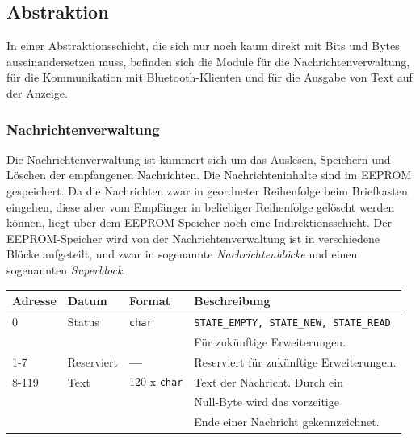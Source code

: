 \documentclass[ngerman]{article}
\begin{document}
\subsection{Abstraktion}

In einer Abstraktionsschicht, die sich nur noch kaum direkt mit Bits und Bytes
auseinandersetzen muss, befinden sich die Module für die
Nachrichtenverwaltung, für die Kommunikation mit Bluetooth-Klienten
und für die Ausgabe von Text auf der Anzeige.


\subsubsection{Nachrichtenverwaltung}

Die Nachrichtenverwaltung ist kümmert sich um das Auslesen, Speichern und Löschen
der empfangenen Nachrichten. Die Nachrichteninhalte sind im EEPROM gespeichert.
Da die Nachrichten zwar in geordneter Reihenfolge beim Briefkasten eingehen, diese aber
vom Empfänger in beliebiger Reihenfolge gelöscht werden können, liegt über dem
EEPROM-Speicher noch eine In\-di\-rek\-tions\-schicht. Der EEPROM-Speicher wird von der
Nachrichtenverwaltung ist in verschiedene Blöcke aufgeteilt, und zwar in
sogenannte \textit{Nachrichtenblöcke} und einen sogenannten
\textit{Superblock}.


\begin{tabular}{|l|l|l|l|}
    \hline
    {\bf Adresse} & {\bf Datum} & {\bf Format} & {\bf Beschreibung} \\
    \hline
    \hline
    0 & Status & {\tt char} & {\tt STATE\_EMPTY, STATE\_NEW,  STATE\_READ} \\
                          &&& Für zukünftige Erweiterungen. \\
    \hline
    1-7 & Reserviert & {\bf --- }  & Reserviert für zukünftige Erweiterungen. \\
    \hline
    8-119 & Text & 120 x {\tt char} & Text der Nachricht. Durch ein \\
                                  &&& Null-Byte wird das vorzeitige \\
                                  &&& Ende einer Nachricht gekennzeichnet. \\
    \hline
\end{tabular}
\end{document}
